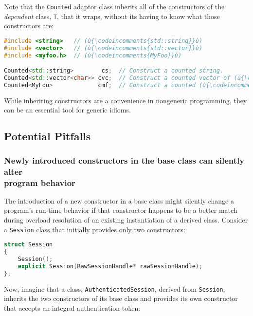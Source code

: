 \noindent Note that the \texttt{Counted} adaptor class inherits all of the
constructors of the \emph{dependent} class, \texttt{T}, that it wraps,
without its having to know what those constructors are:

\begin{lstlisting}[language=C++]
#include <string>   // (ù{\codeincomments{std::string}}ù)
#include <vector>   // (ù{\codeincomments{std::vector}}ù)
#include <myfoo.h>  // (ù{\codeincomments{MyFoo}}ù)

Counted<std::string>        cs;  // Construct a counted string.
Counted<std::vector<char>> cvc;  // Construct a counted vector of (ù{\codeincomments{char}}ù).
Counted<MyFoo>             cmf;  // Construct a counted (ù{\codeincomments{MyFoo}}ù) object.
\end{lstlisting}

\noindent While inheriting constructors are a convenience in nongeneric
programming, they can be an essential tool for generic idioms.

\subsection[Potential Pitfalls]{Potential Pitfalls}\label{potential-pitfalls-ctorinheriting}

\subsubsection[Newly introduced constructors in the base class can silently alter program behavior]{Newly introduced constructors in the base class can silently alter\\[0.5ex] program behavior}\label{newly-introduced-constructors-in-the-base-class-can-silently-alter-program-behavior}

The introduction of a new constructor in a base class might silently
change a program's run-time behavior if that constructor happens to be a
better match during overload resolution of an existing instantiation of
a derived class. Consider a \texttt{Session} class that initially provides only two constructors:

\begin{lstlisting}[language=C++]
struct Session
{
    Session();
    explicit Session(RawSessionHandle* rawSessionHandle);
};
\end{lstlisting}

\noindent Now, imagine that a class, \texttt{AuthenticatedSession}, derived from
\texttt{Session}, inherits the two constructors of its base class and provides its own constructor that accepts an integral
authentication token:


